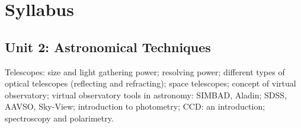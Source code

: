 \section*{Syllabus}

\subsection*{Unit 2: Astronomical Techniques}
Telescopes: size and light gathering power; resolving power; different types of optical telescopes (reflecting and refracting); space telescopes; concept of virtual observatory; virtual observatory tools in astronomy: SIMBAD, Aladin; SDSS, AAVSO, Sky-View; introduction to photometry; CCD: an introduction; spectroscopy and polarimetry.
